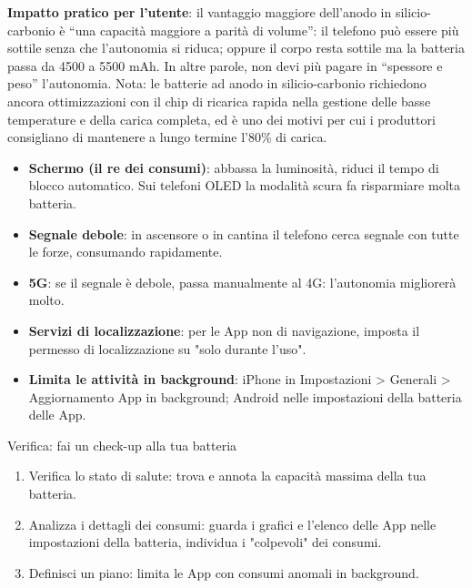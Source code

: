 \textbf{Impatto pratico per l'utente}: il vantaggio maggiore dell'anodo in silicio-carbonio è “una capacità maggiore a parità di volume”: il telefono può essere più sottile senza che l'autonomia si riduca; oppure il corpo resta sottile ma la batteria passa da 4500 a 5500 mAh. In altre parole, non devi più pagare in “spessore e peso” l'autonomia. Nota: le batterie ad anodo in silicio-carbonio richiedono ancora ottimizzazioni con il chip di ricarica rapida nella gestione delle basse temperature e della carica completa, ed è uno dei motivi per cui i produttori consigliano di mantenere a lungo termine l'80\% di carica.


\begin{itemize}
  \item \textbf{Schermo (il re dei consumi)}: abbassa la luminosità, riduci il tempo di blocco automatico. Sui telefoni OLED la modalità scura fa risparmiare molta batteria.
  \item \textbf{Segnale debole}: in ascensore o in cantina il telefono cerca segnale con tutte le forze, consumando rapidamente.
  \item \textbf{5G}: se il segnale è debole, passa manualmente al 4G: l'autonomia migliorerà molto.
  \item \textbf{Servizi di localizzazione}: per le App non di navigazione, imposta il permesso di localizzazione su "solo durante l'uso".
  \item \textbf{Limita le attività in background}: iPhone in Impostazioni > Generali > Aggiornamento App in background; Android nelle impostazioni della batteria delle App.
\end{itemize}

\begin{tcbpractice}{Verifica: fai un check-up alla tua batteria}
\begin{enumerate}
  \item Verifica lo stato di salute: trova e annota la capacità massima della tua batteria.
  \item Analizza i dettagli dei consumi: guarda i grafici e l'elenco delle App nelle impostazioni della batteria, individua i "colpevoli" dei consumi.
  \item Definisci un piano: limita le App con consumi anomali in background.
\end{enumerate}

\end{tcbpractice}
